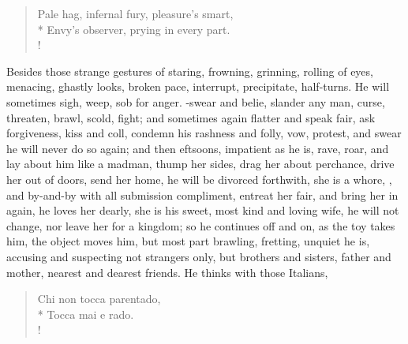 \begin{verse}
Pale hag, infernal fury, pleasure's smart,\\*
Envy's observer, prying in every part.\\!
\end{verse}

Besides those strange gestures of staring, frowning, grinning, rolling
of eyes, menacing, ghastly looks, broken pace, interrupt, precipitate,
half-turns. He will sometimes sigh, weep, sob for anger. -swear and belie, slander any
man, curse, threaten, brawl, scold, fight; and sometimes again flatter
and speak fair, ask forgiveness, kiss and coll, condemn his rashness
and folly, vow, protest, and swear he will never do so again; and then
eftsoons, impatient as he is, rave, roar, and lay about him like a
madman, thump her sides, drag her about perchance, drive her out of
doors, send her home, he will be divorced forthwith, she is a whore,
\etc{}, and by-and-by with all submission compliment, entreat her fair,
and bring her in again, he loves her dearly, she is his sweet, most
kind and loving wife, he will not change, nor leave her for a kingdom;
so he continues off and on, as the toy takes him, the object moves him,
but most part brawling, fretting, unquiet he is, accusing and
suspecting not strangers only, but brothers and sisters, father and
mother, nearest and dearest friends. He thinks with those Italians,
%
\begin{latin}
\begin{verse}%
Chi non tocca parentado,\\*
Tocca mai e rado.\\!
\end{verse}%
\end{latin}

